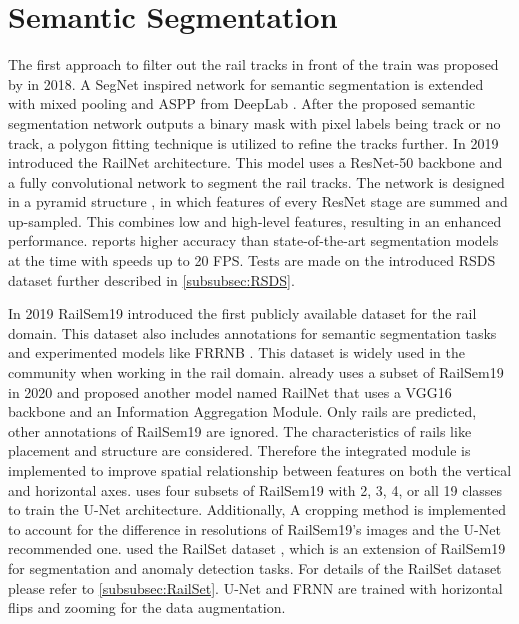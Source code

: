 \section{Semantic Segmentation}
\label{sec:SemanticSegmentation}

The first approach to filter out the rail tracks in front of the train was proposed by \cite{firstRailSegmentation2018} in 2018.
A SegNet \cite{SegNet2017} inspired network for semantic segmentation is extended with mixed pooling \cite{mixedPooling2014} and \ac{ASPP} from DeepLab \cite{deepLab2018}.
After the proposed semantic segmentation network outputs a binary mask with pixel labels being track or no track, a polygon fitting technique is utilized to refine the tracks further.
In 2019 \cite{railNet2019} introduced the RailNet architecture.
This model uses a ResNet-50 \cite{ResNet} backbone and a fully convolutional network \cite{FullyConvolutionalNetworks2015} to segment the rail tracks.
The network is designed in a pyramid structure \cite{FPN2017_two_stage-detector}, in which features of every ResNet stage are summed and up-sampled.
This combines low and high-level features, resulting in an enhanced performance.
\cite{railNet2019} reports higher accuracy than state-of-the-art segmentation models at the time with speeds up to 20 \ac{FPS}.
Tests are made on the introduced \ac{RSDS} dataset further described in \autoref{subsubsec:RSDS}.

In 2019 RailSem19 \cite{railsem19dataset} introduced the first publicly available dataset for the rail domain.
This dataset also includes annotations for semantic segmentation tasks and experimented models like FRRNB \cite{FRRNBModel2017}.
This dataset is widely used in the community when working in the rail domain.
\cite{RailNet2020} already uses a subset of RailSem19 in 2020 and proposed another model named RailNet that uses a VGG16 \cite{VGGNet2015} backbone and an Information Aggregation Module.
Only rails are predicted, other annotations of RailSem19 are ignored.
The characteristics of rails like placement and structure are considered.
Therefore the integrated module is implemented to improve spatial relationship between features on both the vertical and horizontal axes.
\cite{automatedSemSeg2022} uses four subsets of RailSem19 with 2, 3, 4, or all 19 classes to train the U-Net \cite{uNet2015} architecture.
Additionally, A cropping method is implemented to account for the difference in resolutions of RailSem19's images and the U-Net recommended one.
\cite{hadded2022application} used the RailSet dataset \cite{railSet2022}, which is an extension of RailSem19 for segmentation and anomaly detection tasks.
For details of the RailSet dataset please refer to \autoref{subsubsec:RailSet}.
U-Net \cite{uNet2015} and FRNN \cite{FRRNBModel2017} are trained with horizontal flips and zooming for the data augmentation.

